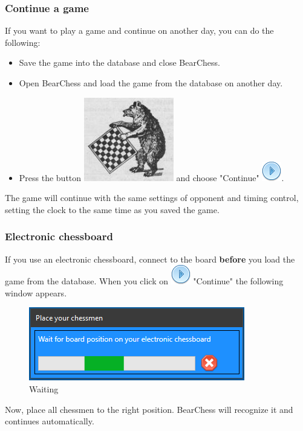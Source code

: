 \documentclass[11pt,a4paper]{article}
\begin{document}
\subsubsection{Continue a game} \label{ContinueAGame}
If you want to play a game and continue on another day, you can do the following:
\begin{itemize}
    \item Save the game into the database and close BearChess.
    \item Open BearChess and load the game from the database on another day.
    \item Press the button \includegraphics[scale=0.2]{bearchess_2.png} and choose "Continue" \includegraphics[scale=0.5]{control_play_blue.png}.
\end{itemize}
The game will continue with the same settings of opponent and timing control, setting the clock to the same time as you saved the game.

\subsubsection{Electronic chessboard}
If you use an electronic chessboard, connect to the board \textbf{before} you load the game from the database. When you click on \includegraphics[scale=0.5]{control_play_blue.png}  "Continue"
the following window appears.
\begin{figure}[H]
	\centering
	\includegraphics[scale=0.9]{waitPosition.png}
	\caption{Waiting}
	\label{fig:waitPosition}
\end{figure}
Now, place all chessmen to the right position. BearChess will recognize it and continues automatically.
\end{document}
